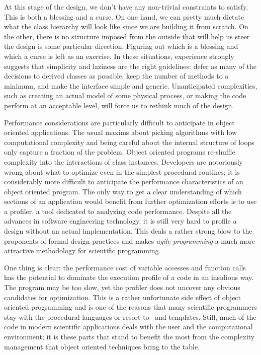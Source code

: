 At this stage of the design, we don't have any non-trivial constraints to satisfy. This is both
a blessing and a curse. On one hand, we can pretty much dictate what the class hierarchy will
look like since we are building it from scratch. On the other, there is no structure imposed
from the outside that will help us steer the design is some particular direction. Figuring out
which is a blessing and which a curse is left as an exercise. In these situations, experience
strongly suggests that simplicity and laziness are the right guidelines: defer as many of the
decisions to derived classes as possible, keep the number of methods to a minimum, and make the
interface simple and generic. Unanticipated complexities, such as creating an actual model of
some physical process, or making the code perform at an acceptable level, will force us to
rethink much of the design.

Performance considerations are particularly difficult to anticipate in object oriented
applications. The usual maxims about picking algorithms with low computational complexity and
being careful about the internal structure of loops only capture a fraction of the problem.
Object oriented programs re-shuffle complexity into the interactions of class instances.
Developers are notoriously wrong about what to optimize even in the simplest procedural
routines; it is considerably more difficult to anticipate the performance characteristics of an
object oriented program. The only way to get a clear understanding of which sections of an
application would benefit from further optimization efforts is to use a profiler, a tool
dedicated to analyzing code performance. Despite all the advances in software engineering
technology, it is still very hard to profile a design without an actual implementation. This
deals a rather strong blow to the proponents of formal design practices and makes {\em agile
programming}\cite{agile} a much more attractive methodology for scientific programming.

One thing is clear: the performance cost of variable accesses and function calls has the
potential to dominate the execution profile of a code in an insidious way. The program may be
too slow, yet the profiler does not uncover any obvious candidates for optimization. This is a
rather unfortunate side effect of object oriented programming and is one of the reasons that
many scientific programmers stay with the procedural languages or resort to \cpp\ and
templates. Still, much of the code in modern scientific applications deals with the user and
the computational environment; it is these parts that stand to benefit the most from the
complexity management that object oriented techniques bring to the table.

